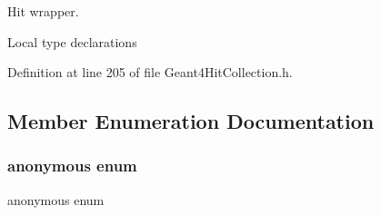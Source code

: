 Hit wrapper. 

Local type declarations 

Definition at line 205 of file Geant4\+Hit\+Collection.\+h.



\subsection{Member Enumeration Documentation}
\hypertarget{class_d_d4hep_1_1_simulation_1_1_geant4_hit_collection_a8fe757ca872800562e5317df0597c844}{}\label{class_d_d4hep_1_1_simulation_1_1_geant4_hit_collection_a8fe757ca872800562e5317df0597c844} 
\subsubsection{\texorpdfstring{anonymous enum}{anonymous enum}}
{\footnotesize\ttfamily anonymous enum}

